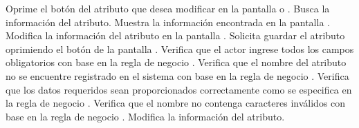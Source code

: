  \begin{UCtrayectoria}
    \UCpaso[\UCactor] Oprime el botón \btnEditar del atributo que desea modificar en la pantalla  o .
	\UCpaso[\UCsist] Busca la información del atributo.
    \UCpaso[\UCsist] Muestra la información encontrada en la pantalla . 
    \UCpaso[\UCactor] Modifica la información del atributo en la pantalla . \label{cu11.1.2:ingresaDatos}
    \UCpaso[\UCactor] Solicita guardar el atributo oprimiendo el botón  de la pantalla . 
    \UCpaso[\UCsist] Verifica que el actor ingrese todos los campos obligatorios con base en la regla de negocio  . 
    \UCpaso[\UCsist] Verifica que el nombre del atributo no se encuentre registrado en el sistema con base en la regla de negocio  . 
    \UCpaso[\UCsist] Verifica que los datos requeridos sean proporcionados correctamente como se especifica en la regla de negocio .  
    \UCpaso[\UCsist] Verifica que el nombre no contenga caracteres inválidos con base en la regla de negocio . 
    \UCpaso[\UCsist] Modifica la información del atributo.
 \end{UCtrayectoria}
 
